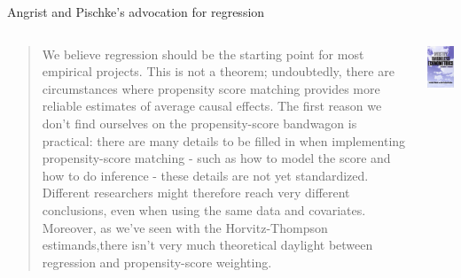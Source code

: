 \documentclass[notes,11pt, aspectratio=169]{beamer}
\begin{document}
\begin{frame}{Angrist and Pischke's advocation for regression}
\begin{columns}[T] %
  \begin{column}{.65\textwidth}
    \begin{quote}
      We believe regression should be the starting point for most empirical projects. This is not a theorem; undoubtedly, there are circumstances where propensity score matching provides more reliable estimates of average causal effects. The first reason we don't find ourselves on the propensity-score bandwagon is practical: there are many details to be filled in when implementing propensity-score matching - such as how to model the score and how to do inference - these details are not yet standardized. Different researchers might therefore reach very different conclusions, even when using the same data and covariates. Moreover, as we've seen with the Horvitz-Thompson estimands,there isn't very much theoretical daylight between regression and propensity-score weighting.
      \end{quote}
\end{column}%
\hfill%
\begin{column}{.35\textwidth}
\includegraphics[width=\linewidth]{images/mhe.jpg}
\end{column}%
\end{columns}
\end{frame}
\end{document}
